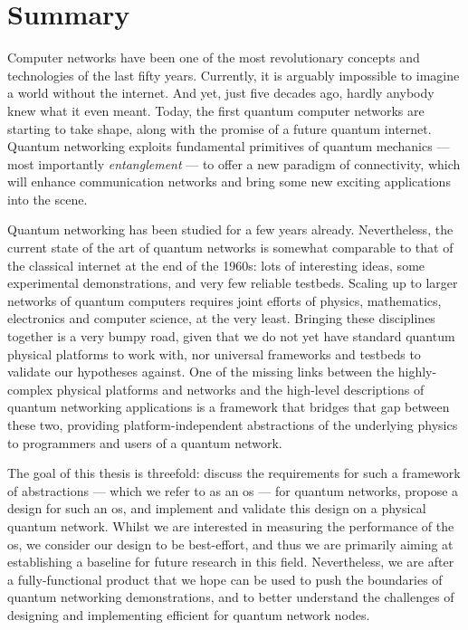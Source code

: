 \chapter*{Summary}

Computer networks have been one of the most revolutionary concepts and technologies of the last
fifty years. Currently, it is arguably impossible to imagine a world without the internet. And yet,
just five decades ago, hardly anybody knew what it even meant. Today, the first quantum computer
networks are starting to take shape, along with the promise of a future quantum internet. Quantum
networking exploits fundamental primitives of quantum mechanics --- most importantly
\emph{entanglement} --- to offer a new paradigm of connectivity, which will enhance communication
networks and bring some new exciting applications into the scene.

Quantum networking has been studied for a few years already. Nevertheless, the current state of the
art of quantum networks is somewhat comparable to that of the classical internet at the end of the
1960s: lots of interesting ideas, some experimental demonstrations, and very few reliable testbeds.
Scaling up to larger networks of quantum computers requires joint efforts of physics, mathematics,
electronics and computer science, at the very least. Bringing these disciplines together is a very
bumpy road, given that we do not yet have standard quantum physical platforms to work with, nor
universal frameworks and testbeds to validate our hypotheses against. One of the missing links
between the highly-complex physical platforms and networks and the high-level descriptions of
quantum networking applications is a framework that bridges that gap between these two, providing
platform-independent abstractions of the underlying physics to programmers and users of a quantum
network.

The goal of this thesis is threefold: discuss the requirements for such a framework of abstractions
--- which we refer to as an \acrlong{os} --- for quantum networks, propose a design for such an
\acrlong{os}, and implement and validate this design on a physical quantum network. Whilst we are
interested in measuring the performance of the \acrlong{os}, we consider our design to be
best-effort, and thus we are primarily aiming at establishing a baseline for future research in this
field. Nevertheless, we are after a fully-functional product that we hope can be used to push the
boundaries of quantum networking demonstrations, and to better understand the challenges of
designing and implementing efficient  for quantum network nodes.
